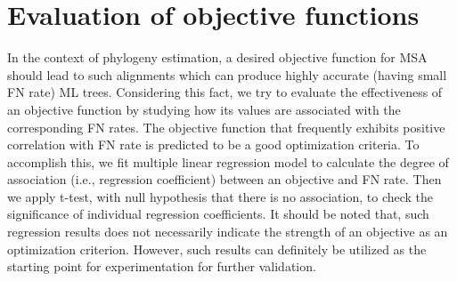 \section{Evaluation of objective functions}
\label{sec:obj_eval}
In the context of phylogeny estimation, a desired objective function for MSA should lead to such alignments which can produce highly accurate (having small FN rate) ML trees. Considering this fact, we try to evaluate the effectiveness of an objective function by studying how its values are associated with the corresponding FN rates. The objective function that frequently exhibits positive correlation with FN rate is predicted to be a good optimization criteria. To accomplish this, we fit multiple linear regression model to calculate the degree of association (i.e., regression coefficient) between an objective and FN rate. Then we apply t-test, with null hypothesis that there is no association, to check the significance of individual regression coefficients. It should be noted that, such regression results does not necessarily indicate the strength of an objective as an optimization criterion. However, such results can definitely be utilized as the starting point for experimentation for further validation.